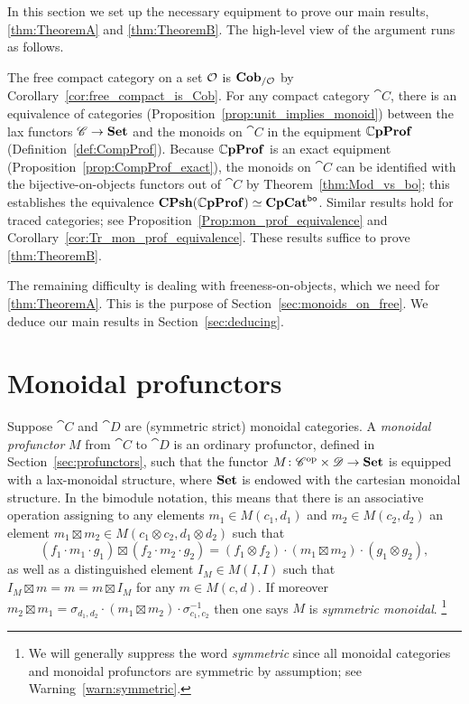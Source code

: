 \documentclass[11pt,oneside,article]{memoir}
\begin{document}
In this section we set up the necessary equipment to prove our main results, \ref{thm:TheoremA} and
\ref{thm:TheoremB}. The high-level view of the argument runs as follows.

The free compact category on a set $\mathcal{O}$ is $\mathbf{Cob}_{/\mathcal{O}}$ by
Corollary~\ref{cor:free_compact_is_Cob}. For any compact category $\cat{C}$, there is an equivalence
of categories (Proposition~\ref{prop:unit_implies_monoid}) between the lax functors $\mathscr{C}\to\mathbf{Set}$
and the monoids on $\cat{C}$ in the equipment $\mathbb{C}\mathbf{pProf}$ (Definition~\ref{def:CompProf}). Because
$\mathbb{C}\mathbf{pProf}$ is an exact equipment (Proposition~\ref{prop:CompProf_exact}), the monoids on $\cat{C}$
can be identified with the bijective-on-objects functors out of $\cat{C}$ by
Theorem~\ref{thm:Mod_vs_bo}; this establishes the equivalence
$\mathbf{CPsh}(\mathbb{C}\mathbf{pProf})\simeq\mathbf{CpCat}^{\mathsf{bo}}$. Similar results hold for traced categories; see
Proposition~\ref{Prop:mon_prof_equivalence} and Corollary~\ref{cor:Tr_mon_prof_equivalence}. These
results suffice to prove \ref{thm:TheoremB}.

The remaining difficulty is dealing with freeness-on-objects, which we need for \ref{thm:TheoremA}.
This is the purpose of Section~\ref{sec:monoids_on_free}. We deduce our main results in
Section~\ref{sec:deducing}.

\section{Monoidal profunctors}
      \label{sec:monoidal_profunctors}

Suppose $\cat{C}$ and $\cat{D}$ are (symmetric strict) monoidal categories. A \emph{monoidal
profunctor} $M$ from $\cat{C}$ to $\cat{D}$ is an ordinary profunctor, defined in
Section~\ref{sec:profunctors}, such that the functor $M\colon {\mathscr{C}}^{\text{op}}\times\mathscr{D}\to\mathbf{Set}$ is
equipped with a lax-monoidal structure, where $\mathbf{Set}$ is endowed with the cartesian monoidal
structure. In the bimodule notation, this means that there is an associative operation assigning to
any elements $m_1\in M(c_1,d_1)$ and $m_2\in M(c_2,d_2)$ an element $m_1\boxtimes m_2\in
M(c_1\otimes c_2,d_1\otimes d_2)$ such that
\[
   (f_1\cdot m_1\cdot g_1)\boxtimes(f_2\cdot m_2\cdot g_2)
      = (f_1\otimes f_2)\cdot(m_1\boxtimes m_2)\cdot(g_1\otimes g_2),
\]
as well as a distinguished element $I_M\in M(I,I)$ such that $I_M\boxtimes m = m = m\boxtimes I_M$
for any $m\in M(c,d)$. If moreover $m_2\boxtimes m_1 = \sigma_{d_1,d_2}\cdot(m_1\boxtimes
m_2)\cdot\sigma_{c_1,c_2}^{-1}$ then one says $M$ is \emph{symmetric monoidal}.%
\footnote{
   We will generally suppress the word \emph{symmetric} since all monoidal categories and monoidal
   profunctors are symmetric by assumption; see Warning~\ref{warn:symmetric}.
}
\end{document}
